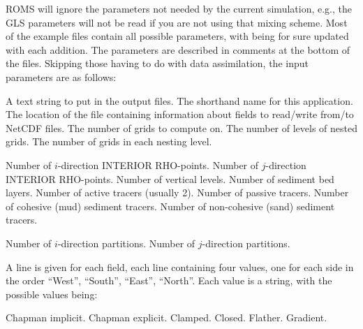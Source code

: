 ROMS will ignore the parameters not needed by the current simulation,
e.g., the GLS parameters will not be read if you are not using that
mixing scheme. Most of the example files contain all possible
parameters, with  being for sure updated
with each addition. The parameters are described in comments at the
bottom of the  files. Skipping those having to do
with data assimilation, the input parameters are as follows:
\begin{klist}
    \mbox{}
     \begin{klist}
    A text string to put in the output files.
    The shorthand name for this application.
    The location of the  file
     containing information about fields to read/write from/to NetCDF
     files.
    The number of grids to compute on.
    The number of levels of nested grids.
    The number of grids in each nesting level.
     \end{klist}
    \mbox{}
     \begin{klist}
        Number of $i$-direction INTERIOR RHO-points.
        Number of $j$-direction INTERIOR RHO-points.
        Number of vertical levels.
        Number of sediment bed layers.
        Number of active tracers (usually 2).
        Number of passive tracers.
        Number of cohesive (mud) sediment tracers.
        Number of non-cohesive (sand) sediment tracers.
     \end{klist}
    \mbox{}
     \begin{klist}
        Number of $i$-direction partitions.
        Number of $j$-direction partitions.
     \end{klist}
    \mbox{}
     \begin{klist}
        A line is given for each field, each line
       containing four values, one for each side in the order
       ``West'', ``South'', ``East'', ``North''. Each value is a
       string, with the possible values being:
         \begin{klist}
              Chapman implicit.
              Chapman explicit.
              Clamped.
              Closed.
              Flather.
              Gradient.

\end{klist}
\end{klist}
\end{klist}
